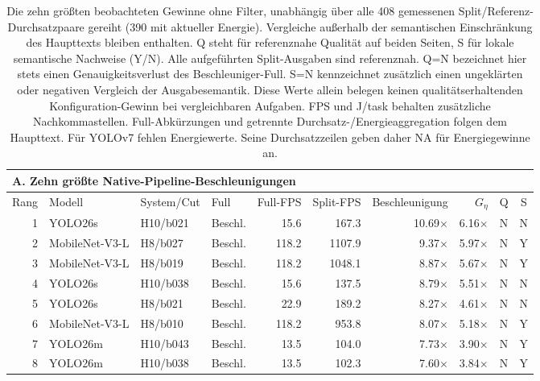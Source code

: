 \begin{table}[t]
\centering
\caption{Die zehn größten beobachteten Gewinne ohne Filter, unabhängig über alle 408 gemessenen Split/Referenz-Durchsatzpaare gereiht (390 mit aktueller Energie). Vergleiche außerhalb der semantischen Einschränkung des Haupttexts bleiben enthalten. Q steht für referenznahe Qualität auf beiden Seiten, S für lokale semantische Nachweise (Y/N). Alle aufgeführten Split-Ausgaben sind referenznah. Q=N bezeichnet hier stets einen Genauigkeitsverlust des Beschleuniger-Full. S=N kennzeichnet zusätzlich einen ungeklärten oder negativen Vergleich der Ausgabesemantik. Diese Werte allein belegen keinen qualitätserhaltenden Konfiguration-Gewinn bei vergleichbaren Aufgaben. FPS und J/task behalten zusätzliche Nachkommastellen. Full-Abkürzungen und getrennte Durchsatz-/Energieaggregation folgen dem Haupttext. Für YOLOv7 fehlen Energiewerte. Seine Durchsatzzeilen geben daher NA für Energiegewinne an.}
\label{tab:best-cases-unfiltered}
\begingroup
\fontsize{9}{10.4}\selectfont
\setlength{\tabcolsep}{3.5pt}
\renewcommand{\arraystretch}{1.05}
\begin{tabular*}{\textwidth}{@{\extracolsep{\fill}}rlllrrrrcc@{}}
\toprule
\multicolumn{10}{l}{\textbf{A. Zehn größte Native-Pipeline-Beschleunigungen}}\\
\midrule
Rang & Modell & System/Cut & Full & Full-FPS & Split-FPS & Beschleunigung & $G_\eta$ & Q & S\\
\midrule
1 & YOLO26s & H10/b021 & Beschl. & 15.6 & 167.3 & 10.69$\times$ & 6.16$\times$ & N & N\\
2 & MobileNet-V3-L & H8/b027 & Beschl. & 118.2 & 1107.9 & 9.37$\times$ & 5.97$\times$ & N & Y\\
3 & MobileNet-V3-L & H8/b019 & Beschl. & 118.2 & 1048.1 & 8.87$\times$ & 5.67$\times$ & N & Y\\
4 & YOLO26s & H10/b038 & Beschl. & 15.6 & 137.5 & 8.79$\times$ & 5.51$\times$ & N & N\\
5 & YOLO26s & H8/b021 & Beschl. & 22.9 & 189.2 & 8.27$\times$ & 4.61$\times$ & N & N\\
6 & MobileNet-V3-L & H8/b010 & Beschl. & 118.2 & 953.8 & 8.07$\times$ & 5.18$\times$ & N & Y\\
7 & YOLO26m & H10/b043 & Beschl. & 13.5 & 104.0 & 7.73$\times$ & 3.90$\times$ & N & Y\\
8 & YOLO26m & H10/b038 & Beschl. & 13.5 & 102.3 & 7.60$\times$ & 3.84$\times$ & N & Y\\

\end{tabular*}
\end{table}
